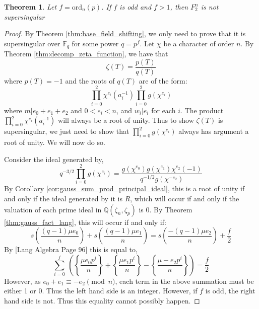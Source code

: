 \documentclass{article}
\newcommand{\Q}{\mathbb{Q}}
\newcommand{\F}{\mathbb{F}}
\newcommand{\ord}[0]{\mathrm{ord}}
\newcommand{\frp}[2]{\left\{\frac{#1}{#2}\right\}}
\newtheorem{theorem}{Theorem}[section]
\theoremstyle{definition}
\theoremstyle{definition}
\theoremstyle{remark}
\begin{document}
\begin{theorem}
Let $f = \ord_n(p)$. If $f$ is odd and $f > 1$, then $F_2^n$ is not supersingular
\end{theorem}

\begin{proof}
By Theorem \ref{thm:base_field_shifting}, we only need to prove that it is supersingular over $\F_q$ for some power $q = p^f$.  Let $\chi$ be a character of order $n$. By Theorem \ref{thm:decomp_zeta_function}, we have that 
\[\zeta(T) = \frac{p(T)}{q(T)}\]
where $p(T) = -1$ and the roots of $q(T)$ are of the form:
\[\prod_{i = 0}^{2}\chi^{e_i}(a_i^{-1})\prod_{i = 0}^{2}g(\chi^{e_i})\]
where $m | e_0 + e_1 + e_2$ and $0 < e_i < n$, and $w_i | e_i$ for each $i$. The product $\prod_{i = 0}^{2}\chi^{e_i}(a_i^{-1})$ will always be a root of unity. Thus to show $\zeta(T)$ is supersingular, we just need to show that $\prod_{i = 0}^{2}g(\chi^{e_i})$ always has argument a root of unity. We will now do so.
\par
Consider the ideal generated by,
\[q^{-3/2}\prod_{i = 0}^{2}g(\chi^{e_i}) = \frac{g(\chi^{e_0})g(\chi^{e_1})\chi^{e_2}(-1)}{q^{-1/2}g(\chi^{-e_2})}\]
By Corollary \ref{cor:gauss_sum_prod_principal_ideal}, this is a root of unity if and only if the ideal generated by it is $R$, which will occur if and only if the valuation of each prime ideal in $\Q(\zeta_n, \zeta_p)$ is 0. By Theorem \ref{thm:gauss_fact_lang}, this will occur if and only if:
\[s\left(\frac{(q-1)\mu e_0}{n}\right) + s\left(\frac{(q-1)\mu e_1}{n}\right) = s\left(\frac{-(q-1)\mu e_2}{n}\right) + \frac{f}{2}\]
By [Lang Algebra Page 96] this is equal to,
\[\sum_{i = 0}^f\ \left(\frp{\mu e_0 p^i}{n} + \frp{\mu e_1 p^i}{n} - \frp{\mu -e_2 p^i}{n}\right) = \frac{f}{2}\]
However, as $e_0 + e_1 \equiv -e_2 \pmod{n}$, each term in the above summation must be either 1 or 0. Thus the left hand side is an integer. However, if $f$ is odd, the right hand side is not. Thus this equality cannot possibly happen.
\end{proof}
\end{document}
